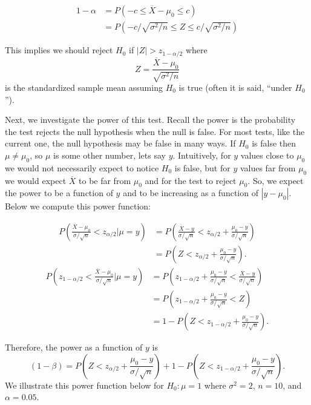 \documentclass[]{book}
\begin{document}
\begin{align*}
1-\alpha &= P(-c\leq \overline X - \mu_0 \leq c)\\
& = P(-c/\sqrt{\sigma^2/n} \leq Z \leq c/\sqrt{\sigma^2/n})
\end{align*}

This implies we should reject \(H_0\) if \(|Z|>z_{1-\alpha/2}\) where
\[Z = \frac{\overline X - \mu_0}{\sqrt{\sigma^2/n}}\] is the
standardized sample mean assuming \(H_0\) is true (often it is said,
``under \(H_0\)'').

Next, we investigate the power of this test. Recall the power is the
probability the test rejects the null hypothesis when the null is false.
For most tests, like the current one, the null hypothesis may be false
in many ways. If \(H_0\) is false then \(\mu\ne \mu_0\), so \(\mu\) is
some other number, lets say \(y\). Intuitively, for \(y\) values close
to \(\mu_0\) we would not necessarily expect to notice \(H_0\) is false,
but for \(y\) values far from \(\mu_0\) we would expect \(\overline X\)
to be far from \(\mu_0\) and for the test to reject \(\mu_0\). So, we
expect the power to be a function of \(y\) and to be increasing as a
function of \(|y-\mu_0|\). Below we compute this power function:

\begin{align*}
P\left(\frac{\overline X - \mu_0}{\sigma/\sqrt{n}} < z_{\alpha/2}|\mu = y\right) & =  P\left(\frac{\overline X - y}{\sigma/\sqrt{n}} < z_{\alpha/2}+\frac{\mu_0-y}{\sigma/\sqrt{n}}\right)\\
& = P\left(Z < z_{\alpha/2}+\frac{\mu_0-y}{\sigma/\sqrt{n}}\right).
\end{align*}\begin{align*}
P\left(z_{1-\alpha/2} < \frac{\overline X - \mu_0}{\sigma/\sqrt{n}}|\mu = y\right) & =  P\left(z_{1-\alpha/2}+\frac{\mu_0-y}{\sigma/\sqrt{n}}<\frac{\overline X - y}{\sigma/\sqrt{n}}\right)\\
& = P\left(z_{1-\alpha/2}+\frac{\mu_0-y}{\sigma/\sqrt{n}} < Z\right)\\
& = 1-P\left(Z < z_{1-\alpha/2}+\frac{\mu_0-y}{\sigma/\sqrt{n}}\right).
\end{align*}

Therefore, the power as a function of \(y\) is
\[(1-\beta) = P\left(Z < z_{\alpha/2}+\frac{\mu_0-y}{\sigma/\sqrt{n}}\right)+1-P\left(Z < z_{1-\alpha/2}+\frac{\mu_0-y}{\sigma/\sqrt{n}}\right).\]
We illustrate this power function below for \(H_0:\mu = 1\) where
\(\sigma^2 = 2\), \(n=10\), and \(\alpha = 0.05\).
\end{document}
